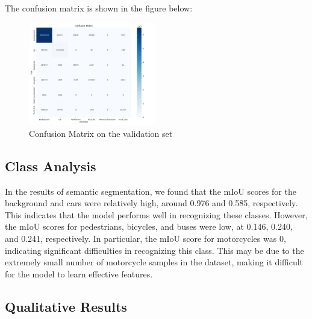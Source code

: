 \documentclass[conference]{IEEEtran}
\begin{document}

The confusion matrix is shown in the figure below:

\begin{figure}[htbp]
    \centerline{\includegraphics[width=0.5\textwidth]{matrials/confusion_matrix.png}}
    \caption{Confusion Matrix on the validation set}
    \label{fig:confusion}
\end{figure}




\subsection{Class Analysis}


In the results of semantic segmentation, we found that the mIoU scores for the background and cars were relatively high, around 0.976 and 0.585, respectively. This indicates that the model performs well in recognizing these classes. However, the mIoU scores for pedestrians, bicycles, and buses were low, at 0.146, 0.240, and 0.241, respectively. In particular, the mIoU score for motorcycles was 0, indicating significant difficulties in recognizing this class. This may be due to the extremely small number of motorcycle samples in the dataset, making it difficult for the model to learn effective features. 

\subsection{Qualitative Results}
\end{document}
